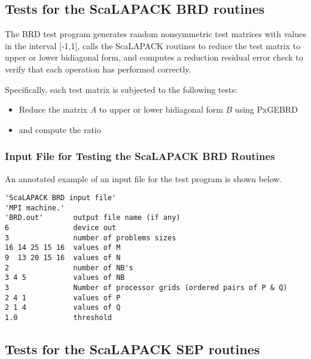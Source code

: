 \documentclass[11pt]{report}
\newcommand{\dent}{\hspace*{\parindent}}
\begin{document}
\subsection{Tests for the ScaLAPACK BRD routines}

The BRD test program generates random nonsymmetric test matrices with
values in the interval [-1,1], calls the ScaLAPACK 
routines to reduce the test matrix to upper or lower bidiagonal form,
and computes a reduction residual error check to verify that each operation
has performed correctly.

Specifically, each test matrix is subjected to the following tests:

\begin{itemize}
\item Reduce the matrix $A$ to upper or lower bidiagonal form $B$ using PxGEBRD
\item and compute the ratio
\end{itemize}

\subsubsection{Input File for Testing the ScaLAPACK BRD Routines}
\dent
An annotated example of an input file for the
test program is shown below.

\begin{verbatim}
'ScaLAPACK BRD input file'
'MPI machine.'
'BRD.out'       output file name (if any)
6               device out
3               number of problems sizes
16 14 25 15 16  values of M
9  13 20 15 16  values of N
2               number of NB's
3 4 5           values of NB
3               Number of processor grids (ordered pairs of P & Q)
2 4 1           values of P
2 1 4           values of Q
1.0             threshold
\end{verbatim}

\subsection{Tests for the ScaLAPACK SEP routines}
\end{document}
